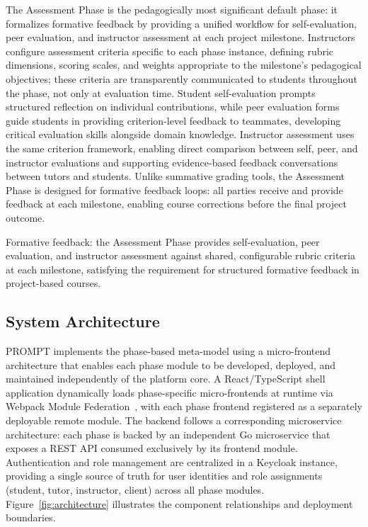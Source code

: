 The Assessment Phase is the pedagogically most significant default phase:
it formalizes formative feedback by providing a unified workflow for self-evaluation, peer evaluation, and instructor assessment at each project milestone.
Instructors configure assessment criteria specific to each phase instance, defining rubric dimensions, scoring scales, and weights appropriate to the milestone's pedagogical objectives;
these criteria are transparently communicated to students throughout the phase, not only at evaluation time.
Student self-evaluation prompts structured reflection on individual contributions, while peer evaluation forms guide students in providing criterion-level feedback to teammates, developing critical evaluation skills alongside domain knowledge.
Instructor assessment uses the same criterion framework, enabling direct comparison between self, peer, and instructor evaluations and supporting evidence-based feedback conversations between tutors and students.
Unlike summative grading tools, the Assessment Phase is designed for formative feedback loops:
all parties receive and provide feedback at each milestone, enabling course corrections before the final project outcome.

\begin{fulfillment}
Formative feedback: the Assessment Phase provides self-evaluation, peer evaluation, and instructor assessment against shared, configurable rubric criteria at each milestone, satisfying the requirement for structured formative feedback in project-based courses.
\end{fulfillment}

\subsection{System Architecture}

PROMPT implements the phase-based meta-model using a micro-frontend architecture that enables each phase module to be developed, deployed, and maintained independently of the platform core.
A React/TypeScript shell application dynamically loads phase-specific micro-frontends at runtime via Webpack Module Federation~\cite{webpack-module-federation}, with each phase frontend registered as a separately deployable remote module.
The backend follows a corresponding microservice architecture:
each phase is backed by an independent Go microservice that exposes a REST API consumed exclusively by its frontend module.
Authentication and role management are centralized in a Keycloak instance, providing a single source of truth for user identities and role assignments (student, tutor, instructor, client) across all phase modules.
Figure~\ref{fig:architecture} illustrates the component relationships and deployment boundaries.

